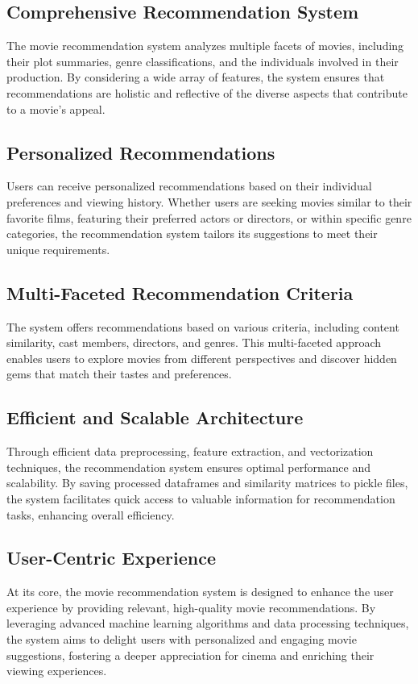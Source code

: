 \documentclass{article}
\begin{document}
\subsection{Comprehensive Recommendation System}
The movie recommendation system analyzes multiple facets of movies, including their plot summaries, genre classifications, and the individuals involved in their production. By considering a wide array of features, the system ensures that recommendations are holistic and reflective of the diverse aspects that contribute to a movie's appeal.

\subsection{Personalized Recommendations}
Users can receive personalized recommendations based on their individual preferences and viewing history. Whether users are seeking movies similar to their favorite films, featuring their preferred actors or directors, or within specific genre categories, the recommendation system tailors its suggestions to meet their unique requirements.

\subsection{Multi-Faceted Recommendation Criteria}
The system offers recommendations based on various criteria, including content similarity, cast members, directors, and genres. This multi-faceted approach enables users to explore movies from different perspectives and discover hidden gems that match their tastes and preferences.

\subsection{Efficient and Scalable Architecture}
Through efficient data preprocessing, feature extraction, and vectorization techniques, the recommendation system ensures optimal performance and scalability. By saving processed dataframes and similarity matrices to pickle files, the system facilitates quick access to valuable information for recommendation tasks, enhancing overall efficiency.

\subsection{User-Centric Experience}
At its core, the movie recommendation system is designed to enhance the user experience by providing relevant, high-quality movie recommendations. By leveraging advanced machine learning algorithms and data processing techniques, the system aims to delight users with personalized and engaging movie suggestions, fostering a deeper appreciation for cinema and enriching their viewing experiences.
\end{document}

